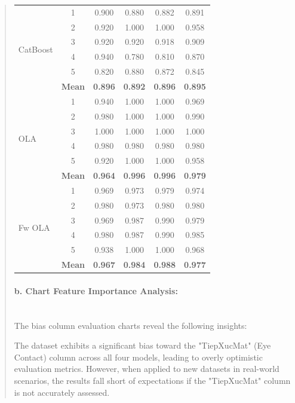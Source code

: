 \documentclass[runningheads]{llncs}
\begin{document}
\begin{abstract}
\begin{table}[H]
\begin{tabular}{|l|c|c|c|c|c|}
\multirow{6}{*}{CatBoost}
& 1 & 0.900 & 0.880 & 0.882 & 0.891 \\
& 2 & 0.920 & 1.000 & 1.000 & 0.958 \\
& 3 & 0.920 & 0.920 & 0.918 & 0.909 \\
& 4 & 0.940 & 0.780 & 0.810 & 0.870 \\
& 5 & 0.820 & 0.880 & 0.872 & 0.845 \\
& \textbf{Mean} & \textbf{0.896} & \textbf{0.892} & \textbf{0.896} & \textbf{0.895} \\
\hline

\multirow{6}{*}{OLA}
& 1 & 0.940 & 1.000 & 1.000 & 0.969 \\
& 2 & 0.980 & 1.000 & 1.000 & 0.990 \\
& 3 & 1.000 & 1.000 & 1.000 & 1.000 \\
& 4 & 0.980 & 0.980 & 0.980 & 0.980 \\
& 5 & 0.920 & 1.000 & 1.000 & 0.958 \\
& \textbf{Mean} & \textbf{0.964} & \textbf{0.996} & \textbf{0.996} & \textbf{0.979} \\
\hline

\multirow{6}{*}{Fw OLA}
& 1 & 0.969 & 0.973 & 0.979 & 0.974 \\
& 2 & 0.980 & 0.973 & 0.980 & 0.980 \\
& 3 & 0.969 & 0.987 & 0.990 & 0.979 \\
& 4 & 0.980 & 0.987 & 0.990 & 0.985 \\
& 5 & 0.938 & 1.000 & 1.000 & 0.968 \\
& \textbf{Mean} & \textbf{0.967} & \textbf{0.984} & \textbf{0.988} & \textbf{0.977} \\
\hline
\end{tabular}
\end{table}

\paragraph{\textbf{b. Chart Feature Importance Analysis:}}\\
The bias column evaluation charts reveal the following insights:

The dataset exhibits a significant bias toward the "TiepXucMat" (Eye Contact) column across all four models, leading to overly optimistic evaluation metrics. However, when applied to new datasets in real-world scenarios, the results fall short of expectations if the "TiepXucMat" column is not accurately assessed.


\end{abstract}
\end{document}

